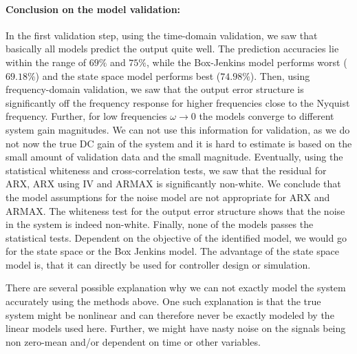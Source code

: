 \paragraph{Conclusion on the model validation: } In the first validation step, using the time-domain validation, we saw that basically all models predict the output quite well.
The prediction accuracies lie within the range of $69\%$ and $75\%$, while the Box-Jenkins model performs worst ($69.18\%$) and the state space model performs best ($74.98\%$).
Then, using frequency-domain validation, we saw that the output error structure is significantly off the frequency response for higher frequencies close to the Nyquist frequency.
Further, for low frequencies $\omega \rightarrow 0$ the models converge to different system gain magnitudes.
We can not use this information for validation, as we do not now the true DC gain of the system and it is hard to estimate is based on the small amount of validation data and the small magnitude.
Eventually, using the statistical whiteness and cross-correlation tests, we saw that the residual for ARX, ARX using IV and ARMAX is significantly non-white.
We conclude that the model assumptions for the noise model are not appropriate for ARX and ARMAX.
The whiteness test for the output error structure shows that the noise in the system is indeed non-white.
Finally, none of the models passes the statistical tests.
Dependent on the objective of the identified model, we would go for the state space or the Box Jenkins model.
The advantage of the state space model is, that it can directly be used for controller design or simulation.

There are several possible explanation why we can not exactly model the system accurately using the methods above.
One such explanation is that the true system might be nonlinear and can therefore never be exactly modeled by the linear models used here.
Further, we might have nasty noise on the signals being non zero-mean and/or dependent on time or other variables.